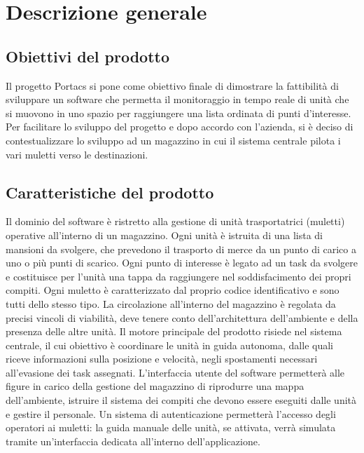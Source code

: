 \section{Descrizione generale}

\subsection{Obiettivi del prodotto}
Il progetto Portacs si pone come obiettivo finale di dimostrare la fattibilità di sviluppare un software che permetta il monitoraggio in tempo reale di unità che si muovono in uno spazio per raggiungere una lista ordinata di punti d’interesse. Per facilitare lo sviluppo del progetto e dopo accordo con l'azienda, si è deciso di contestualizzare lo sviluppo ad un magazzino in cui il sistema centrale pilota i vari muletti verso le destinazioni.

\subsection{Caratteristiche del prodotto}
Il dominio del software è ristretto alla gestione di unità trasportatrici (muletti) operative all’interno di un magazzino. Ogni unità è istruita di una lista di mansioni da svolgere, che prevedono il trasporto di merce da un punto di carico a uno o più punti di scarico. Ogni punto di interesse è legato ad un task da svolgere e costituisce per l’unità una tappa da raggiungere nel soddisfacimento dei propri compiti. Ogni muletto è caratterizzato dal proprio codice identificativo e sono tutti dello stesso tipo.
La circolazione all’interno del magazzino è regolata da precisi vincoli di viabilità, deve tenere conto dell’architettura dell’ambiente e della presenza delle altre unità. 
Il motore principale del prodotto risiede nel sistema centrale, il cui obiettivo è coordinare le unità in guida autonoma, dalle quali riceve informazioni sulla posizione e velocità, negli spostamenti necessari all’evasione dei task assegnati. L’interfaccia utente del software permetterà alle figure in carico della gestione del magazzino di riprodurre una mappa dell’ambiente, istruire il sistema dei compiti che devono essere eseguiti dalle unità e gestire il personale. Un sistema di autenticazione permetterà l’accesso degli operatori ai muletti: la guida manuale delle unità, se attivata, verrà simulata tramite un’interfaccia dedicata all’interno dell’applicazione.

